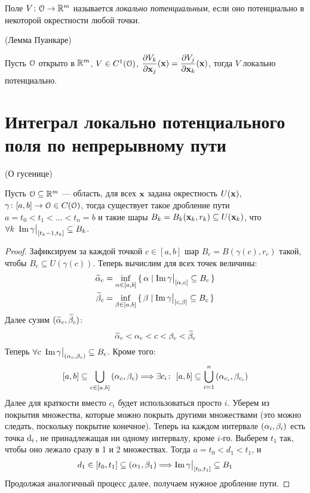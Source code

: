 \begin{definition}
    Поле $V \colon \mathcal{O} \to \mathbb{R}^m$ называется \textit{локально потенциальным}, если
    оно потенциально в некоторой окрестности любой точки.
\end{definition}

\begin{corollary}(Лемма Пуанкаре)

    Пусть $\mathcal{O}$ открыто в $\mathbb{R}^m$, $V \in C^1(\mathcal{O})$, $\dfrac{\partial V_k}{\partial \mathbf{x}_j}(\mathbf{x}) =
    \dfrac{\partial V_j}{\partial \mathbf{x}_k}(\mathbf{x})$, тогда $V$ локально потенциально.
\end{corollary}

\section{Интеграл локально потенциального поля по непрерывному пути}

\begin{lemma}(О гусенице)

    Пусть $\mathcal{O} \subseteq \mathbb{R}^m$ --- область, для всех $\mathbf{x}$ задана окрестность $U(\mathbf{x})$,
    $\gamma \colon [a, b] \to \mathcal{O} \in C(\mathcal{O})$, тогда существует такое дробление
    пути $a = t_0 < t_1 < \ldots < t_n = b$ и такие шары $B_k = B_k(\mathbf{x}_k, r_k)
    \subseteq U(\mathbf{x}_k)$, что $\forall k~ \operatorname{Im}{\gamma\big|_{[t_k - 1, t_k]}} \subseteq
    B_k$.
\end{lemma}
\begin{proof}
    Зафиксируем за каждой точкой $c \in [a, b]$ шар $B_c = B(\gamma(c), r_c)$ такой,
    чтобы $B_c \subseteq U(\gamma(c))$. Теперь вычислим для всех точек величины:
\begin{align*}
    \widetilde{\alpha}_c &= \inf_{\alpha \in [a, b]}{\{\,\alpha \mid \operatorname{Im}{\gamma\big|_{[\alpha, c]}}
            \subseteq B_c\,\}} \\
    \widetilde{\beta}_c &= \inf_{\beta \in [a, b]}{\{\,\beta \mid \operatorname{Im}{\gamma\big|_{[c, \beta]}}
            \subseteq B_c\,\}}
\end{align*}
    Далее сузим $(\widetilde{\alpha}_c, \widetilde{\beta}_c)$:
\[
    \widetilde{\alpha}_c < \alpha_c < c < \beta_c < \widetilde{\beta}_c
\]
    Теперь $\forall c~ \operatorname{Im}{\gamma\big|_{(\alpha_c, \beta_c)}} \subseteq B_c$. Кроме того:
\[
    [a, b] \subseteq \bigcup_{c \in [a, b]}{(\alpha_c, \beta_c)} \Longrightarrow
    \exists c_i\colon~ [a, b] \subseteq \bigcup_{i = 1}^{n}{(\alpha_{c_i}, \beta_{c_i})}
\]
    Далее для краткости вместо $c_i$ будет использоваться просто $i$.
    Уберем из покрытия множества, которые можно покрыть другими множествами
    (это можно следать, поскольку покрытие конечное). Теперь на каждом
    интервале $(\alpha_i, \beta_i)$ есть точка $\mathrm{d}_i$, не принадлежащая ни одному
    интервалу, кроме $i$-го. Выберем $t_1$ так, чтобы оно лежало сразу в 1 и
    2 множествах. Тогда
    $a = t_0 < d_1 < t_1$, и
\[
    d_1 \in [t_0, t_1] \subseteq (\alpha_1, \beta_1)
    \Longrightarrow \operatorname{Im}{\gamma\big|_{[t_0, t_1]}} \subseteq B_1
\]
    Продолжая аналогичный процесс далее, получаем нужное дробление пути.
\end{proof}

